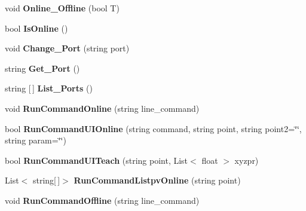 \begin{DoxyCompactItemize}
\item 
\mbox{\label{class_controller_ad823d3d6ceeb7aec70100f43d2e94748}} 
void {\bfseries Online\+\_\+\+Offline} (bool T)
\item 
\mbox{\label{class_controller_afc8517ea3abd9acb92173b55342b320a}} 
bool {\bfseries Is\+Online} ()
\item 
\mbox{\label{class_controller_a9d890757158c307d9e9d1915b03b5928}} 
void {\bfseries Change\+\_\+\+Port} (string port)
\item 
\mbox{\label{class_controller_a8a4b22a9b00f39da6e6c2dc063066460}} 
string {\bfseries Get\+\_\+\+Port} ()
\item 
\mbox{\label{class_controller_a7cd4400bd0fe69494c14002b6b2fa649}} 
string \mbox{[}$\,$\mbox{]} {\bfseries List\+\_\+\+Ports} ()
\item 
\mbox{\label{class_controller_a92811ce0f1bce922136d254730a1be8f}} 
void {\bfseries Run\+Command\+Online} (string line\+\_\+command)
\item 
\mbox{\label{class_controller_ae08a706bf80dc97741a7eb65a3ece6d3}} 
bool {\bfseries Run\+Command\+U\+I\+Online} (string command, string point, string point2=\char`\"{}\char`\"{}, string param=\char`\"{}\char`\"{})
\item 
\mbox{\label{class_controller_abeae24ba81e6f83fd3c2502981143212}} 
bool {\bfseries Run\+Command\+U\+I\+Teach} (string point, List$<$ float $>$ xyzpr)
\item 
\mbox{\label{class_controller_a65282850ef11298e5acd69b9ac61cdca}} 
List$<$ string\mbox{[}$\,$\mbox{]}$>$ {\bfseries Run\+Command\+Listpv\+Online} (string point)
\item 
\mbox{\label{class_controller_aa579bf7f25f6004e8e0e25a2dd044315}} 
void {\bfseries Run\+Command\+Offline} (string line\+\_\+command)
\end{DoxyCompactItemize}
